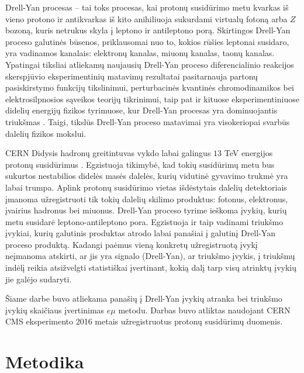 \documentclass[a4paper, 12pt, twoside]{article}
\newcommand{\emu}{e\mu}
\begin{document}
Drell-Yan procesas \cite{DYoriginal} -- tai toks procesas, kai protonų susidūrimo metu kvarkas iš vieno protono ir antikvarkas
iš kito anihiliuoja sukurdami virtualų fotoną arba $Z$ bozoną, kuris netrukus skyla į leptono ir antileptono porą.
Skirtingos Drell-Yan proceso galutinės būsenos, priklausomai nuo to, kokios rūšies leptonai susidaro, yra
vadinamos kanalais: elektronų kanalas, miuonų kanalas, taonų kanalas.
Ypatingai tiksliai atliekamų naujausių Drell-Yan proceso diferencialinio reakcijos skerspjūvio eksperimentinių matavimų
rezultatai \cite{DY2015, DY2018} pasitarnauja partonų pasiskirstymo funkcijų tikslinimui, perturbacinės kvantinės chromodinamikos bei
elektrosilpnosios sąveikos teorijų tikrinimui, taip pat ir kituose eksperimentiniuose didelių energijų fizikos
tyrimuose, kur Drell-Yan procesas yra dominuojantis triukšmas \cite{Higgs2018, Zprime, SUSYtau}.
Taigi, tikslūs Drell-Yan proceso matavimai yra visokeriopai svarbūs dalelių fizikos mokslui.

CERN Didysis hadronų greitintuvas vykdo labai galingus $13$ TeV energijos protonų susidūrimus \cite{DY2018}.
Egzistuoja tikimybė, kad tokių susidūrimų metu bus sukurtos nestabilios didelės masės dalelės,
kurių vidutinė gyvavimo trukmė yra labai trumpa.
Aplink protonų susidūrimo vietas išdėstytais dalelių detektoriais įmanoma užregistruoti tik tokių
dalelių skilimo produktus: fotonus, elektronus, įvairius hadronus bei miuonus.
Drell-Yan proceso tyrime ieškoma įvykių, kurių metu susidarė leptono-antileptono pora.
Egzistuoja ir taip vadinami triukšmo įvykiai, kurių galutinis produktas atrodo labai panašiai
į galutinį Drell-Yan proceso produktą.
Kadangi paėmus vieną konkretų užregistruotą įvykį neįmanoma atskirti, ar jis yra signalo
(Drell-Yan), ar triukšmo įvykis, į triukšmų indėlį reikia atsižvelgti statistiškai įvertinant,
kokią dalį tarp visų atrinktų įvykių jie galėjo sudaryti.

Šiame darbe buvo atliekama panašių į Drell-Yan įvykių atranka bei triukšmo įvykių skaičiaus įvertinimas $\emu$ metodu.
Darbas buvo atliktas naudojant CERN CMS eksperimento 2016 metais užregistruotus protonų susidūrimų duomenis.

\section{Metodika}
\end{document}
